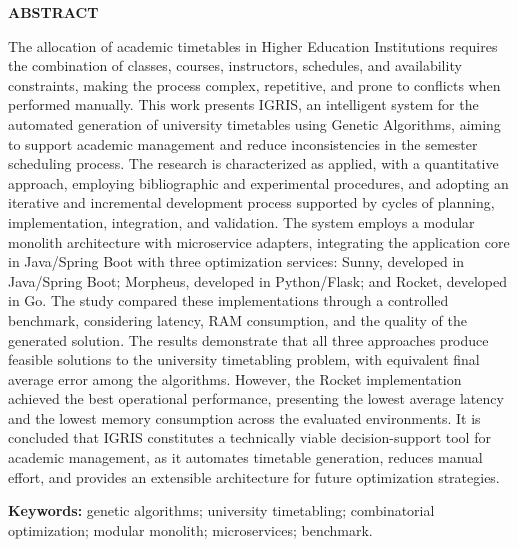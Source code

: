 ﻿%
\newpage
\begin{center}
  {\bfseries ABSTRACT}
\end{center}
\vspace{1cm}

\setlength{\parindent}{0pt}

The allocation of academic timetables in Higher Education Institutions requires the combination of classes, courses, instructors, schedules, and availability constraints, making the process complex, repetitive, and prone to conflicts when performed manually. This work presents IGRIS, an intelligent system for the automated generation of university timetables using Genetic Algorithms, aiming to support academic management and reduce inconsistencies in the semester scheduling process. The research is characterized as applied, with a quantitative approach, employing bibliographic and experimental procedures, and adopting an iterative and incremental development process supported by cycles of planning, implementation, integration, and validation. The system employs a modular monolith architecture with microservice adapters, integrating the application core in Java/Spring Boot with three optimization services: Sunny, developed in Java/Spring Boot; Morpheus, developed in Python/Flask; and Rocket, developed in Go. The study compared these implementations through a controlled benchmark, considering latency, RAM consumption, and the quality of the generated solution. The results demonstrate that all three approaches produce feasible solutions to the university timetabling problem, with equivalent final average error among the algorithms. However, the Rocket implementation achieved the best operational performance, presenting the lowest average latency and the lowest memory consumption across the evaluated environments. It is concluded that IGRIS constitutes a technically viable decision-support tool for academic management, as it automates timetable generation, reduces manual effort, and provides an extensible architecture for future optimization strategies.

\vspace{0.5cm}
\noindent\textbf{Keywords:} genetic algorithms; university timetabling; combinatorial optimization; modular monolith; microservices; benchmark.

\setlength{\parindent}{1.25cm}
